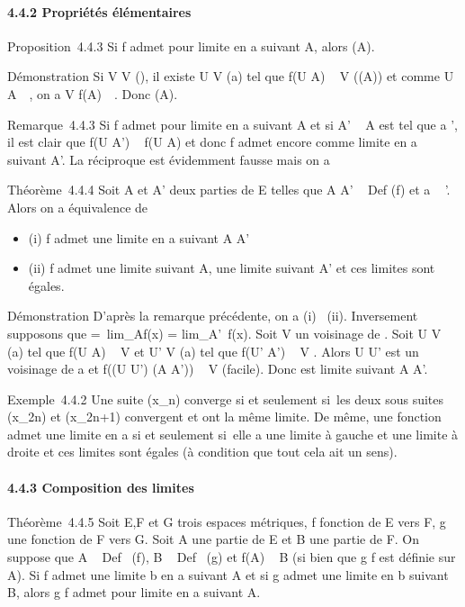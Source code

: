 \documentclass[]{article}
\begin{document}
\paragraph{4.4.2 Propriétés élémentaires}

Proposition~4.4.3 Si f admet \ell pour limite en a suivant A, alors \ell
\in\overlinef(A).

Démonstration Si V \in V (\ell), il existe U \in V (a) tel que f(U \bigcap A) \subset~ V
(\bigcapf(A)) et comme U \bigcap A\neq~\varnothing~, on a V \bigcap
f(A)\neq~\varnothing~. Donc \ell
\in\overlinef(A).

Remarque~4.4.3 Si f admet \ell pour limite en a suivant A et si A' \subset~ A est
tel que a \in\overlineA', il est clair que f(U \bigcap A') \subset~
f(U \bigcap A) et donc f admet encore \ell comme limite en a suivant A'. La
réciproque est évidemment fausse mais on a

Théorème~4.4.4 Soit A et A' deux parties de E telles que A \cup A'
\subset~ Def (f) et a \in\overlineA~
\bigcap\overlineA'. Alors on a équivalence de

\begin{itemize}
\itemsep1pt\parskip0pt
\item
  (i) f admet une limite en a suivant A \cup A'
\item
  (ii) f admet une limite suivant A, une limite suivant A' et ces
  limites sont égales.
\end{itemize}

Démonstration D'après la remarque précédente, on a (i) \rigtharrow~(ii).
Inversement supposons que \ell =\
lim\_Af(x) = lim\_A'~f(x). Soit
V un voisinage de \ell. Soit U \in V (a) tel que f(U \bigcap A) \subset~ V et U' \in V (a)
tel que f(U' \bigcap A') \subset~ V . Alors U \bigcap U' est un voisinage de a et f((U \bigcap
U') \bigcap (A \cup A')) \subset~ V (facile). Donc \ell est limite suivant A \cup A'.

Exemple~4.4.2 Une suite (x\_n) converge si et seulement si~les
deux sous suites (x\_2n) et (x\_2n+1) convergent et ont
la même limite. De même, une fonction admet une limite en a si et
seulement si~elle a une limite à gauche et une limite à droite et ces
limites sont égales (à condition que tout cela ait un sens).

\paragraph{4.4.3 Composition des limites}

Théorème~4.4.5 Soit E,F et G trois espaces métriques, f fonction de E
vers F, g une fonction de F vers G. Soit A une partie de E et B une
partie de F. On suppose que A \subset~ Def~ (f), B
\subset~ Def~ (g) et f(A) \subset~ B (si bien que g \cdot f est
définie sur A). Si f admet une limite b en a suivant A et si g admet une
limite \ell en b suivant B, alors g \cdot f admet \ell pour limite en a suivant A.
\end{document}
